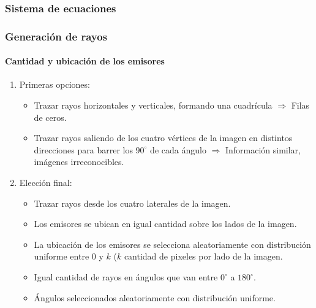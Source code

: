 \documentclass[11pt]{beamer}
\begin{document}
\begin{frame}
\frametitle{Sistema de ecuaciones}
\end{frame}







\begin{frame}
\frametitle{Generación de rayos}
\framesubtitle{Cantidad y ubicación de los emisores}

\begin{enumerate}
    \item Primeras opciones:
    \begin{itemize}
        \item Trazar rayos horizontales y verticales, formando una cuadrícula $\Rightarrow$ Filas de ceros.
        \item Trazar rayos saliendo de los cuatro vértices de la imagen en distintos direcciones para barrer los $90^{\circ}$ de cada ángulo $\Rightarrow$ Información similar, imágenes irreconocibles.
    \end{itemize}
    \item Elección final:
    \begin{itemize}
        
    \item Trazar rayos desde los cuatro laterales de la imagen.
    \item Los emisores se ubican en igual cantidad sobre los lados de la imagen.
    \item La ubicación de los emisores se selecciona aleatoriamente con distribución uniforme entre $0$ y $k$ ($k$ cantidad de pixeles por lado de la imagen.
    \item Igual cantidad de rayos en ángulos que van entre $0^{\circ}$ a $180^{\circ}$.
    \item Ángulos seleccionados aleatoriamente con distribución uniforme.
    \end{itemize}

\end{enumerate}

\end{frame}
\end{document}
